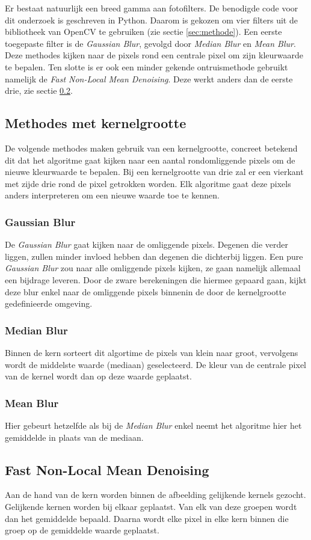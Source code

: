 Er bestaat natuurlijk een breed gamma aan fotofilters. De benodigde code voor dit onderzoek is geschreven in Python. Daarom is gekozen om vier filters uit de bibliotheek van OpenCV te gebruiken (zie sectie \ref{sec:methode}).  Een eerste toegepaste filter is de \textit{Gaussian Blur}, gevolgd door \textit{Median Blur} en \textit{Mean Blur}. Deze methodes kijken naar de pixels rond een centrale pixel om zijn kleurwaarde te bepalen. Ten slotte is er ook een minder gekende ontruismethode gebruikt namelijk de \textit{Fast Non-Local Mean Denoising}. Deze werkt anders dan de eerste drie, zie sectie \ref{subsec:fnlmd}.

\subsection{Methodes met kernelgrootte}
De volgende methodes maken gebruik van een kernelgrootte, concreet betekend dit dat het algoritme gaat kijken naar een aantal rondomliggende pixels om de nieuwe kleurwaarde te bepalen. Bij een kernelgrootte van drie zal er een vierkant met zijde drie rond de pixel getrokken worden. Elk algoritme gaat deze pixels anders interpreteren om een nieuwe waarde toe te kennen.
\subsubsection{Gaussian Blur}
De {\it Gaussian Blur} gaat kijken naar de omliggende pixels. Degenen die verder liggen, zullen minder invloed hebben dan degenen die dichterbij liggen. Een pure {\it Gaussian Blur} zou naar alle omliggende pixels kijken, ze gaan namelijk allemaal een bijdrage leveren. Door de zware berekeningen die hiermee gepaard gaan, kijkt deze blur enkel naar de omliggende pixels binnenin de door de kernelgrootte gedefinieerde omgeving. \cite{gaussianBlur}

\subsubsection{Median Blur}
Binnen de kern sorteert dit algortime de pixels van klein naar groot, vervolgens wordt de middelste waarde (mediaan) geselecteerd. De kleur van de centrale pixel van de kernel wordt dan op deze waarde geplaatst.

\subsubsection{Mean Blur}
Hier gebeurt hetzelfde als bij de {\it Median Blur} enkel neemt het algoritme hier het gemiddelde in plaats van de mediaan.

\subsection{Fast Non-Local Mean Denoising}
\label{subsec:fnlmd}
Aan  de hand van de kern worden binnen de afbeelding gelijkende kernels gezocht. Gelijkende kernen worden bij elkaar geplaatst. Van elk van deze groepen wordt dan het gemiddelde bepaald. Daarna wordt elke pixel in elke kern binnen die groep op de gemiddelde waarde geplaatst. \cite{fastExplanation}